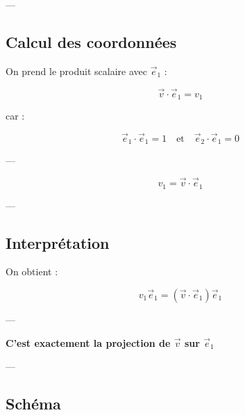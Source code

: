 \documentclass[11pt,a4paper]{article}
\begin{document}
---

\subsection{Calcul des coordonnées}

On prend le produit scalaire avec $\vec{e}_1$ :

\[
\vec{v} \cdot \vec{e}_1 = v_1
\]

car :

\[
\vec{e}_1 \cdot \vec{e}_1 = 1 \quad \text{et} \quad \vec{e}_2 \cdot \vec{e}_1 = 0
\]

---

\[
\boxed{
v_1 = \vec{v} \cdot \vec{e}_1
}
\]

---

\subsection{Interprétation}

On obtient :

\[
v_1 \vec{e}_1 = (\vec{v} \cdot \vec{e}_1)\vec{e}_1
\]

---

\begin{center}
\Large \textbf{C’est exactement la projection de $\vec{v}$ sur $\vec{e}_1$}
\end{center}

---

\subsection{Schéma}

\begin{center}
\end{center}
\end{document}
